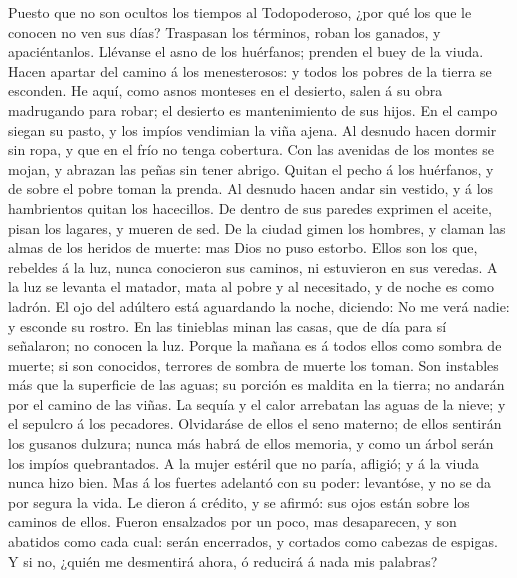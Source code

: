  Puesto que no son ocultos los tiempos al Todopoderoso, ¿por
qué los que le conocen no ven sus días?  Traspasan los
términos, roban los ganados, y apaciéntanlos.  Llévanse el
asno de los huérfanos; prenden el buey de la viuda.  Hacen
apartar del camino á los menesterosos: y todos los pobres de la tierra
se esconden.  He aquí, como asnos monteses en el desierto,
salen á su obra madrugando para robar; el desierto es mantenimiento de
sus hijos.  En el campo siegan su pasto, y los impíos
vendimian la viña ajena.  Al desnudo hacen dormir sin ropa,
y que en el frío no tenga cobertura.  Con las avenidas de
los montes se mojan, y abrazan las peñas sin tener abrigo. 
Quitan el pecho á los huérfanos, y de sobre el pobre toman la prenda.
 Al desnudo hacen andar sin vestido, y á los hambrientos
quitan los hacecillos.  De dentro de sus paredes exprimen
el aceite, pisan los lagares, y mueren de sed.  De la
ciudad gimen los hombres, y claman las almas de los heridos de muerte:
mas Dios no puso estorbo.  Ellos son los que, rebeldes á la
luz, nunca conocieron sus caminos, ni estuvieron en sus veredas.
 A la luz se levanta el matador, mata al pobre y al
necesitado, y de noche es como ladrón.  El ojo del adúltero
está aguardando la noche, diciendo: No me verá nadie: y esconde su
rostro.  En las tinieblas minan las casas, que de día para
sí señalaron; no conocen la luz.  Porque la mañana es á
todos ellos como sombra de muerte; si son conocidos, terrores de sombra
de muerte los toman.  Son instables más que la superficie
de las aguas; su porción es maldita en la tierra; no andarán por el
camino de las viñas.  La sequía y el calor arrebatan las
aguas de la nieve; y el sepulcro á los pecadores. 
Olvidaráse de ellos el seno materno; de ellos sentirán los gusanos
dulzura; nunca más habrá de ellos memoria, y como un árbol serán los
impíos quebrantados.  A la mujer estéril que no paría,
afligió; y á la viuda nunca hizo bien.  Mas á los fuertes
adelantó con su poder: levantóse, y no se da por segura la vida.
 Le dieron á crédito, y se afirmó: sus ojos están sobre los
caminos de ellos.  Fueron ensalzados por un poco, mas
desaparecen, y son abatidos como cada cual: serán encerrados, y cortados
como cabezas de espigas.  Y si no, ¿quién me desmentirá
ahora, ó reducirá á nada mis palabras?

